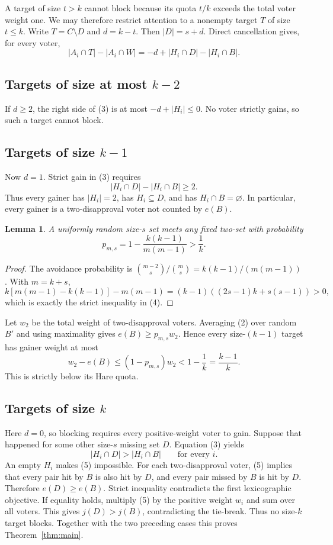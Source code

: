 \documentclass[11pt]{article}
\newtheorem{lemma}[theorem]{Lemma}
\begin{document}
A target of size $t>k$ cannot block because its quota $t/k$ exceeds the
total voter weight one.  We may therefore restrict attention to a nonempty
target $T$ of size $t\le k$.  Write $T=C\setminus D$ and
$d=k-t$.  Then $|D|=s+d$.  Direct cancellation gives, for every voter,
\[
 |A_i\cap T|-|A_i\cap W|
 =-d+|H_i\cap D|-|H_i\cap B|.
 \tag{3}
\]

\subsection{Targets of size at most \texorpdfstring{$k-2$}{k-2}}

If $d\ge2$, the right side of (3) is at most $-d+|H_i|\le0$.  No voter
strictly gains, so such a target cannot block.

\subsection{Targets of size \texorpdfstring{$k-1$}{k-1}}

Now $d=1$.  Strict gain in (3) requires
\[
 |H_i\cap D|-|H_i\cap B|\ge2.
\]
Thus every gainer has $|H_i|=2$, has $H_i\subseteq D$, and has
$H_i\cap B=\varnothing$.  In particular, every gainer is a two-disapproval
voter not counted by $e(B)$.

\begin{lemma}\label{lem:prob}
A uniformly random size-$s$ set meets any fixed two-set with probability
\[
 p_{m,s}=1-\frac{k(k-1)}{m(m-1)}>\frac1k.
 \tag{4}
\]
\end{lemma}

\begin{proof}
The avoidance probability is
$\binom{m-2}{s}/\binom ms=k(k-1)/(m(m-1))$.  With $m=k+s$,
\[
 k[m(m-1)-k(k-1)]-m(m-1)
 =(k-1)((2s-1)k+s(s-1))>0,
\]
which is exactly the strict inequality in (4).
\end{proof}

Let $w_2$ be the total weight of two-disapproval voters.  Averaging (2) over
random $B'$ and using maximality gives $e(B)\ge p_{m,s}w_2$.  Hence every
size-$(k-1)$ target has gainer weight at most
\[
 w_2-e(B)\le(1-p_{m,s})w_2<1-\frac1k=\frac{k-1}{k}.
\]
This is strictly below its Hare quota.

\subsection{Targets of size \texorpdfstring{$k$}{k}}

Here $d=0$, so blocking requires every positive-weight voter to gain.  Suppose
that happened for some other size-$s$ missing set $D$.  Equation (3) yields
\[
 |H_i\cap D|>|H_i\cap B| \qquad\text{for every }i.
 \tag{5}
\]
An empty $H_i$ makes (5) impossible.  For each two-disapproval voter, (5)
implies that every pair hit by $B$ is also hit by $D$, and every pair missed
by $B$ is hit by $D$.  Therefore $e(D)\ge e(B)$.  Strict inequality
contradicts the first lexicographic objective.  If equality holds, multiply
(5) by the positive weight $w_i$ and sum over all voters.  This gives
$j(D)>j(B)$, contradicting the tie-break.  Thus no size-$k$ target blocks.
Together with the two preceding cases this proves Theorem~\ref{thm:main}.
\end{document}
